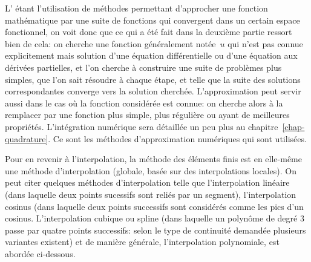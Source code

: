 \begin{histoire}
\medskip
{}
\end{histoire}

L' étant l'utilisation de méthodes permettant d'approcher une fonction mathématique par une suite de fonctions qui convergent dans un certain espace fonctionnel, on voit donc que ce qui a été fait dans la deuxième partie ressort bien de cela: on cherche une fonction généralement notée~$u$ qui n'est pas connue explicitement mais solution d'une équation différentielle ou d'une équation aux dérivées partielles, et l'on cherche à construire une suite de problèmes plus simples, que l'on sait résoudre à chaque étape, et telle que la suite des solutions correspondantes converge vers la solution cherchée. L'approximation peut servir aussi dans le cas où la fonction considérée est connue: on cherche alors à la remplacer par une fonction plus simple, plus régulière ou ayant de meilleures propriétés. L'intégration numérique sera détaillée un peu plus au chapitre~\ref{chap-quadrature}. Ce sont les méthodes d'approximation numériques qui sont utilisées. 

Pour en revenir à l'interpolation, la méthode des éléments finis est en elle-même une méthode d'interpolation (globale, basée sur des interpolations locales). On peut citer quelques méthodes d'interpolation telle que l'interpolation linéaire (dans laquelle deux points sucessifs sont reliés par un segment), l'interpolation cosinus (dans laquelle deux points successifs sont considérés comme les pics d'un cosinus. L'interpolation cubique ou spline (dans laquelle un polynôme de degré 3 passe par quatre points successifs: selon le type de continuité demandée plusieurs variantes existent) et de manière générale, l'interpolation polynomiale, est abordée ci-dessous. 

